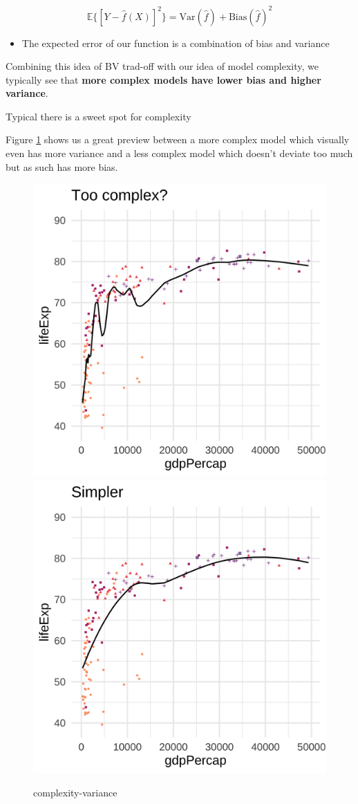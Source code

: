 \documentclass[
]{report}
\providecommand{\tightlist}{%
  \setlength{\itemsep}{0pt}\setlength{\parskip}{0pt}}
\theoremstyle{definition}
\theoremstyle{definition}
\theoremstyle{definition}
\theoremstyle{definition}
\theoremstyle{remark}
\begin{document}
\begin{equation}
  \mathbb{E}\{[Y - \hat{f}(X)]^{2}\} = \text{Var}(\hat{f}) +
  \text{Bias}(\hat{f})^{2} \label{eq:bias-var-to}
\end{equation}

\begin{itemize}
\tightlist
\item
  The expected error of our function is a combination of bias and variance
\end{itemize}

Combining this idea of BV trad-off with our idea of model complexity, we
typically see that \textbf{more complex models have lower bias and higher variance}.

Typical there is a sweet spot for complexity

Figure \ref{fig:complexity-variance} shows us a great preview between a more
complex model which visually even has more variance and a less complex model
which doesn't deviate too much but as such has more bias.

\begin{figure}

{\centering \includegraphics[width=0.4\linewidth]{./assets/03-machine-learning-applications/img/2022-01-23-02-58-55} \includegraphics[width=0.4\linewidth]{./assets/03-machine-learning-applications/img/2022-01-23-02-59-17} 

}

\caption{complexity-variance}\label{fig:complexity-variance}
\end{figure}
\end{document}
